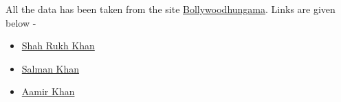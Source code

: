 \documentclass[12pt]{article}
\begin{document}
All the data has been taken from the site \href{https://www.bollywoodhungama.com/}{Bollywoodhungama}. Links are given below - 

\begin{itemize}
    \item \href{https://www.bollywoodhungama.com/celebrity/shah-rukh-khan/box-office/#bh-micro-tab-content}{Shah Rukh Khan}
    
    \item \href{https://www.bollywoodhungama.com/celebrity/salman-khan/box-office/#bh-micro-tab-content}{Salman Khan}
    
    \item \href{https://www.bollywoodhungama.com/celebrity/aamir-khan/box-office/#bh-micro-tab-content}{Aamir Khan}
\end{itemize}
\end{document}
